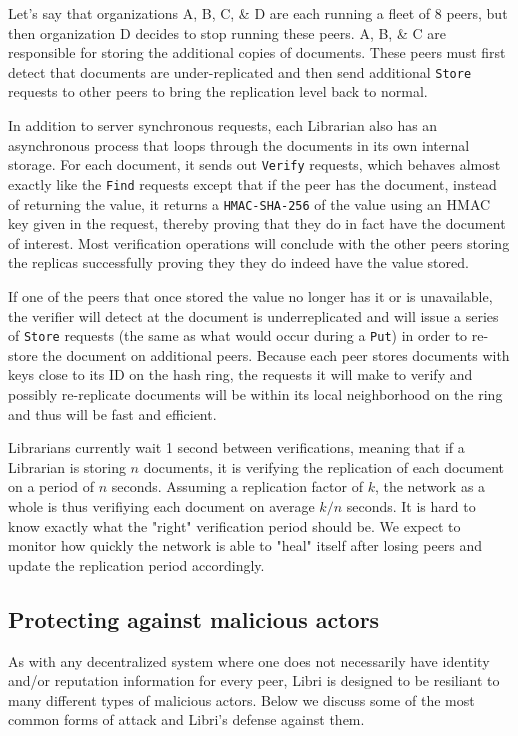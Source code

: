 \documentclass[10pt]{article}
\newcommand{\ttt}[1]{\texttt{#1}}
\begin{document}
Let's say that organizations A, B, C, \& D are each running a fleet of 8 peers, but then organization D decides to stop running these peers. A, B, \& C are responsible for storing the additional copies of documents. These peers must first detect that documents are under-replicated and then send additional \ttt{Store} requests to other peers to bring the replication level back to normal. 

In addition to server synchronous requests, each Librarian also has an asynchronous process that loops through the documents in its own internal storage. For each document, it sends out \ttt{Verify} requests, which behaves almost exactly like the \texttt{Find} requests except that if the peer has the document, instead of returning the value, it returns a \texttt{HMAC-SHA-256} of the value using an HMAC key given in the request, thereby proving that they do in fact have the document of interest. Most verification operations will conclude with the other peers storing the replicas successfully proving they they do indeed have the value stored. 

If one of the peers that once stored the value no longer has it or is unavailable, the verifier will detect at the document is underreplicated and will issue a series of \ttt{Store} requests (the same as what would occur during a \texttt{Put}) in order to re-store the document on additional peers. Because each peer stores documents with keys close to its ID on the hash ring, the requests it will make to verify and possibly re-replicate documents will be within its local neighborhood on the ring and thus will be fast and efficient.

Librarians currently wait 1 second between verifications, meaning that if a Librarian is storing $n$ documents, it is verifying the replication of each document on a period of $n$ seconds. Assuming a replication factor of $k$, the network as a whole is thus verifiying each document on average $k/n$ seconds. It is hard to know exactly what the "right" verification period should be. We expect to monitor how quickly the network is able to "heal" itself after losing peers and update the replication period accordingly.

\subsection{Protecting against malicious actors}

As with any decentralized system where one does not necessarily have identity and/or reputation information for every peer, Libri is designed to be resiliant to many different types of malicious actors. Below we discuss some of the most common forms of attack and Libri's defense against them. 
\end{document}
